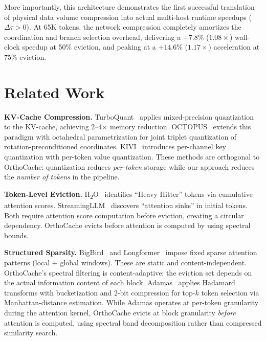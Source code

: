 \documentclass[conference,10pt]{IEEEtran}
\begin{document}
More importantly, this architecture demonstrates the first successful translation of physical data volume compression into actual multi-host runtime speedups ($\Delta\tau > 0$). At 65K tokens, the network compression completely amortizes the coordination and branch selection overhead, delivering a $+7.8\%$ ($1.08\times$) wall-clock speedup at 50\% eviction, and peaking at a $+14.6\%$ ($1.17\times$) acceleration at 75\% eviction.

\section{Related Work}\label{sec:related}

\textbf{KV-Cache Compression.}
TurboQuant~\cite{turboquant} applies mixed-precision quantization to the
KV-cache, achieving 2--4$\times$ memory reduction.
OCTOPUS~\cite{octopus} extends this paradigm with octahedral parametrization
for joint triplet quantization of rotation-preconditioned coordinates.
KIVI~\cite{kivi} introduces
per-channel key quantization with per-token value quantization. These methods
are orthogonal to OrthoCache: quantization reduces \emph{per-token} storage
while our approach reduces the \emph{number of tokens} in the pipeline.

\textbf{Token-Level Eviction.}
H\textsubscript{2}O~\cite{h2o} identifies ``Heavy Hitter'' tokens via
cumulative attention scores. StreamingLLM~\cite{streamingllm} discovers
``attention sinks'' in initial tokens. Both require attention score computation
before eviction, creating a circular dependency. OrthoCache evicts before
attention is computed by using spectral bounds.

\textbf{Structured Sparsity.}
BigBird~\cite{bigbird} and Longformer~\cite{longformer} impose fixed sparse
attention patterns (local + global windows). These are static and
content-independent. OrthoCache's spectral filtering is content-adaptive:
the eviction set depends on the actual information content of each block.
Adamas~\cite{adamas} applies Hadamard transforms with bucketization and 2-bit
compression for top-$k$ token selection via Manhattan-distance estimation.
While Adamas operates at per-token granularity during the attention kernel,
OrthoCache evicts at block granularity \emph{before} attention is computed,
using spectral band decomposition rather than compressed similarity search.
\end{document}
